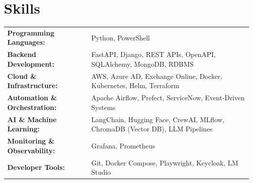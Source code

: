 \section{Skills}\label{sec:skills}
{\small
\begin{tabularx}{\linewidth}{@{}>{\bfseries}l@{\hspace{0.5em}}X@{}}
Programming Languages:      & Python, PowerShell \\[3pt]
Backend Development:        & FastAPI, Django, REST APIs, OpenAPI, SQLAlchemy, MongoDB, RDBMS \\[3pt]
Cloud \& Infrastructure:    & AWS, Azure AD, Exchange Online, Docker, Kubernetes, Helm, Terraform \\[3pt]
Automation \& Orchestration: & Apache Airflow, Prefect, ServiceNow, Event-Driven Systems \\[3pt]
AI \& Machine Learning:     & LangChain, Hugging Face, CrewAI, MLflow, ChromaDB (Vector DB), LLM Pipelines \\[3pt]
Monitoring \& Observability: & Grafana, Prometheus \\[3pt]
Developer Tools:            & Git, Docker Compose, Playwright, Keycloak, LM Studio \\
\end{tabularx}
}